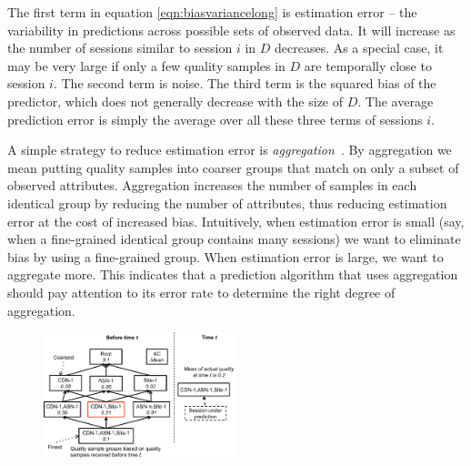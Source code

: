 The first term in equation \eqref{eqn:biasvariancelong} is estimation error -- the variability in predictions across possible sets of observed data.  It will increase as the number of sessions similar to session $i$ in $D$ decreases. As a special case, it may be very large if only a few quality samples in $D$ are temporally close to session $i$.  The second term is noise.  The third term is the squared bias of the predictor, which does not generally decrease with the size of $D$.  The average prediction error is simply the average over all these three terms of sessions $i$. 

\label{subsec:aggregation}
A simple strategy to reduce estimation error is {\it aggregation}~\cite{any citation?}.  By aggregation we mean putting quality samples into coarser groups that match on only a subset of observed attributes.  Aggregation increases the number of samples in each identical group by reducing the number of attributes, thus reducing estimation error at the cost of increased bias. 
Intuitively, when estimation error is small (say, when a fine-grained identical group contains many sessions) we want to eliminate bias by using a fine-grained group.  When estimation error is large, we want to aggregate more.    This indicates that a prediction algorithm that uses aggregation should pay attention to its error rate to determine the right degree of aggregation.


\begin{figure}[h!]
\centering
 \includegraphics[width=0.5\textwidth] {figures/fig-optimal-AC.pdf}
\label{fig:example-optimal-ac}
\end{figure}

